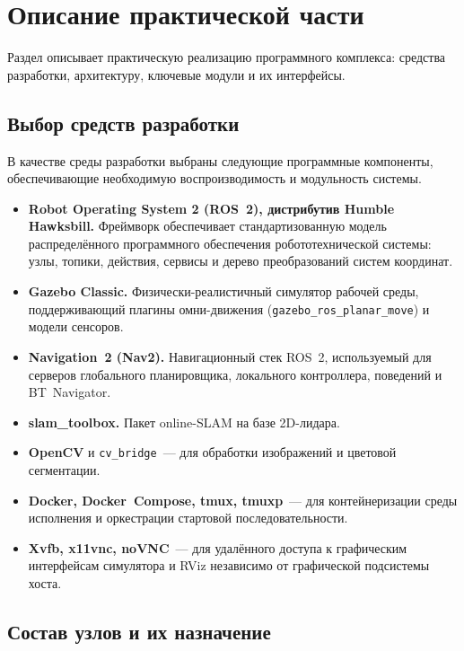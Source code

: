 \section{Описание практической части}
\label{sec:implementation}

Раздел описывает практическую реализацию программного комплекса:
средства разработки, архитектуру, ключевые модули и их интерфейсы.

\subsection{Выбор средств разработки}

В качестве среды разработки выбраны следующие программные
компоненты, обеспечивающие необходимую воспроизводимость и
модульность системы.

\begin{itemize}
    \item \textbf{Robot Operating System 2 (ROS~2), дистрибутив Humble
          Hawksbill.} Фреймворк обеспечивает стандартизованную модель
          распределённого программного обеспечения робототехнической
          системы: узлы, топики, действия, сервисы и дерево
          преобразований систем координат.
    \item \textbf{Gazebo Classic.} Физически-реалистичный симулятор
          рабочей среды, поддерживающий плагины омни-движения
          (\texttt{gazebo\_ros\_planar\_move}) и модели сенсоров.
    \item \textbf{Navigation~2 (Nav2).} Навигационный стек ROS~2,
          используемый для серверов глобального планировщика,
          локального контроллера, поведений и BT~Navigator.
    \item \textbf{slam\_toolbox.} Пакет online-SLAM на базе 2D-лидара.
    \item \textbf{OpenCV} и \texttt{cv\_bridge}~--- для обработки
          изображений и цветовой сегментации.
    \item \textbf{Docker, Docker~Compose, tmux, tmuxp}~--- для
          контейнеризации среды исполнения и оркестрации стартовой
          последовательности.
    \item \textbf{Xvfb, x11vnc, noVNC}~--- для удалённого доступа к
          графическим интерфейсам симулятора и RViz независимо от
          графической подсистемы хоста.
\end{itemize}

\subsection{Состав узлов и их назначение}

